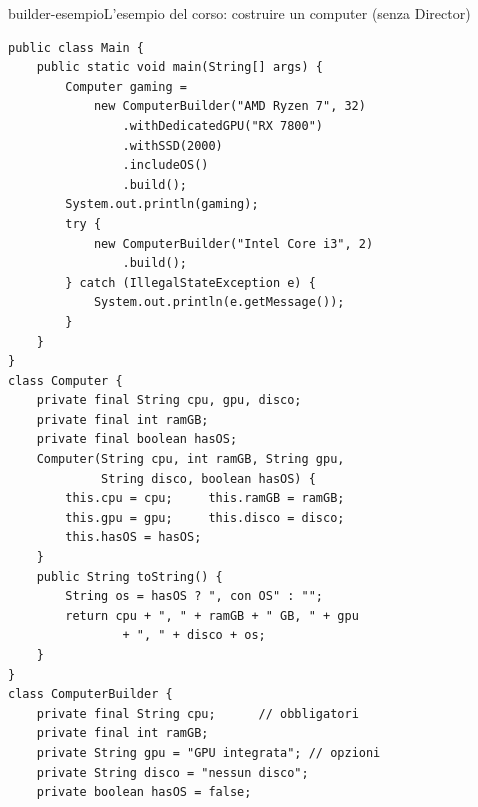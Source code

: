 \begin{programma}{builder-esempio}{L'esempio del corso: costruire un computer (senza Director)}
\begin{lstlisting}[style=javacs, name=Main.java]
public class Main {
    public static void main(String[] args) {
        Computer gaming =
            new ComputerBuilder("AMD Ryzen 7", 32)
                .withDedicatedGPU("RX 7800")
                .withSSD(2000)
                .includeOS()
                .build();
        System.out.println(gaming);
        try {
            new ComputerBuilder("Intel Core i3", 2)
                .build();
        } catch (IllegalStateException e) {
            System.out.println(e.getMessage());
        }
    }
}
class Computer {
    private final String cpu, gpu, disco;
    private final int ramGB;
    private final boolean hasOS;
    Computer(String cpu, int ramGB, String gpu,
             String disco, boolean hasOS) {
        this.cpu = cpu;     this.ramGB = ramGB;
        this.gpu = gpu;     this.disco = disco;
        this.hasOS = hasOS;
    }
    public String toString() {
        String os = hasOS ? ", con OS" : "";
        return cpu + ", " + ramGB + " GB, " + gpu
                + ", " + disco + os;
    }
}
class ComputerBuilder {
    private final String cpu;      // obbligatori
    private final int ramGB;
    private String gpu = "GPU integrata"; // opzioni
    private String disco = "nessun disco";
    private boolean hasOS = false;


\end{lstlisting}
\end{programma}
